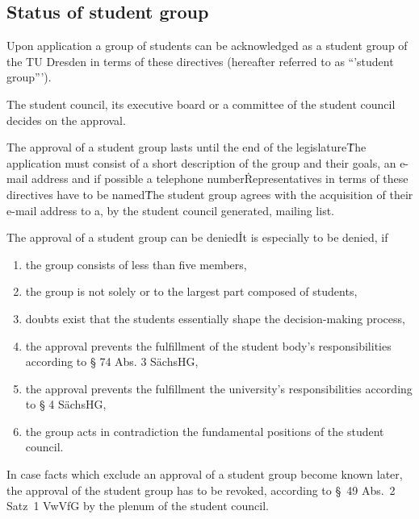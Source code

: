 \setcounter{section}{0} 

\begin{multicols}{2} 
\section{Status of student group} 
\Abs \Satz Upon application a group of students can be acknowledged as a student group of the TU Dresden in terms of these directives (hereafter referred to as “’student group”’).

\Abs \Satz The student council, its executive board or a committee of the student council decides on the approval. 

\Abs \Satz The approval of a student group lasts until the end of the legislature\. The application must consist of a short description of the group and their goals, an e-mail address and if possible a telephone number\. Representatives in terms of these directives have to be named\. The student group agrees with the acquisition of their e-mail address to a, by the student council generated, mailing list.

\Abs \Satz The approval of a student group can be denied\. It is especially to be denied, if
\begin{enumerate} 
\item the group consists of less than five members,
\item the group is not solely or to the largest part composed of students,
\item doubts exist that the students essentially shape the decision-making process,
\item the approval prevents the fulfillment of the student body’s responsibilities according to § 74 Abs. 3 SächsHG,
\item the approval prevents the fulfillment the university’s responsibilities according to § 4 SächsHG,
\item the group acts in contradiction the fundamental positions of the student council.
\end{enumerate}

\Satz In case facts which exclude an approval of a student group become known later, the approval of the student group has to be revoked, according to §~49 Abs.~2 Satz~1 VwVfG by the plenum of the student council. 


\end{multicols}
